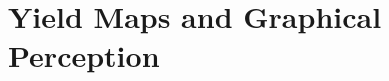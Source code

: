 \documentclass[
  authoryear,
  preprint,
  3p]{elsarticle}
\begin{document}
\hypertarget{yield-maps-and-graphical-perception}{%
\section{Yield Maps and Graphical
Perception}\label{yield-maps-and-graphical-perception}}

\begin{figure}

\begin{minipage}[t]{0.50\linewidth}

{\centering 


}

\end{minipage}%
%
\begin{minipage}[t]{0.50\linewidth}

{\centering 

\raisebox{-\height}{

}}
\end{minipage}
\end{figure}
\end{document}
